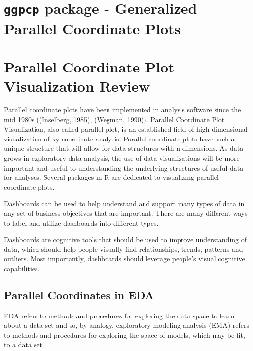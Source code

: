 \documentclass[print]{nuthesis}
\begin{document}
\hypertarget{ggpcp-package---generalized-parallel-coordinate-plots}{%
\section{\texorpdfstring{\texttt{ggpcp} package - Generalized Parallel Coordinate Plots}{ggpcp package - Generalized Parallel Coordinate Plots}}\label{ggpcp-package---generalized-parallel-coordinate-plots}}

\hypertarget{parallel-coordinate-plot-visualization-review}{%
\section{Parallel Coordinate Plot Visualization Review}\label{parallel-coordinate-plot-visualization-review}}

Parallel coordinate plots have been implemented in analysis software since the mid 1980s ((Inselberg, 1985), (Wegman, 1990)). Parallel Coordinate Plot Visualization, also called parallel plot, is an established field of high dimensional visualization of xy coordinate analysis. Parallel coordinate plots have such a unique structure that will allow for data structures with n-dimensions. As data grows in exploratory data analysis, the use of data visualizations will be more important and useful to understanding the underlying structures of useful data for analyses. Several packages in R are dedicated to visualizing parallel coordinate plots.

Dashboards can be used to help understand and support many types of data in any set of business objectives that are important. There are many different ways to label and utilize dashboards into different types.

Dashboards are cognitive tools that should be used to improve understanding of data, which should help people visually find relationships, trends, patterns and outliers. Most importantly, dashboards should leverage people's visual cognitive capabilities.

\hypertarget{parallel-coordinates-in-eda}{%
\subsection{Parallel Coordinates in EDA}\label{parallel-coordinates-in-eda}}

EDA refers to methods and procedures for exploring the data space to learn about a data set and so, by analogy, exploratory modeling analysis (EMA) refers to methods and procedures for exploring the space of models, which may be fit, to a data set.
\end{document}
